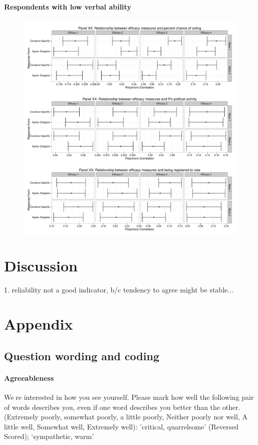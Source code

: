 \documentclass[man,apacite,floatsintext]{apa6}
\begin{document}
\paragraph{Respondents with low verbal ability}


\begin{figure}
\includegraphics[width=\textwidth]{output/plot2validity.pdf}
\end{figure}

\section{Discussion}

1. reliability not a good indicator, b/c tendency to agree might be stable...
\section{Appendix}

\subsection{Question wording and coding}

\paragraph{Agreeableness}
We￿re interested in how you see yourself. Please mark how well the following pair of words describes you, even if one word describes you better than the other. (Extremely poorly, somewhat poorly, a little poorly, Neither poorly nor well, A little well, Somewhat well, Extremely well):  'critical, quarrelsome' (Reversed Scored); `sympathetic, warm' 
\end{document}
